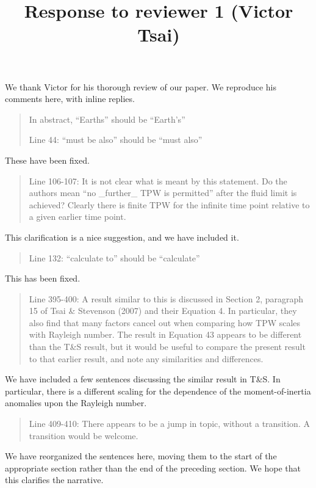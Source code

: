 \documentclass[a4paper,12pt]{article}
\title{Response to reviewer 1 (Victor Tsai)}
\author{}
\date{}
\begin{document}
\maketitle

We thank Victor for his thorough review of our paper.
We reproduce his comments here, with inline replies.

\begin{quote}
In abstract, ``Earths'' should be ``Earth's''
  
Line 44: ``must be also'' should be ``must also''
\end{quote}
These have been fixed.

\begin{quote}
Line 106-107: It is not clear what is meant by this statement. Do the authors mean ``no \_further\_ TPW is permitted'' after the fluid limit is achieved? Clearly there is finite TPW for the infinite time point relative to a given earlier time point.
\end{quote}
This clarification is a nice suggestion, and we have included it.

\begin{quote}
Line 132: ``calculate to'' should be ``calculate''
\end{quote}
This has been fixed.
     
\begin{quote}
Line 395-400: A result similar to this is discussed in Section 2, paragraph 15 of Tsai \& Stevenson (2007) and their Equation 4. In particular, they also find that many factors cancel out when comparing how TPW scales with Rayleigh number. The result in Equation 43 appears to be different than the T\&S result, but it would be useful to compare the present result to that earlier result, and note any similarities and differences.
\end{quote}
We have included a few sentences discussing the similar result in T\&S.
In particular, there is a different scaling for the dependence of the moment-of-inertia
anomalies upon the Rayleigh number.

\begin{quote}
Line 409-410: There appears to be a jump in topic, without a transition. A transition would be welcome.
\end{quote}
We have reorganized the sentences here, moving them to the start of the appropriate section rather than the end of the preceding section. We hope that this clarifies the narrative.
\end{document}
